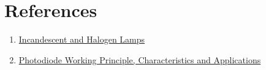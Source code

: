 \section*{References}

\begin{enumerate}

\item \href{https://www.fh-muenster.de/ciw/downloads/personal/juestel/juestel/4-InkohaerenteLichtquellen-Glueh-_und_Halogenlampen_english_-1.pdf}{Incandescent and Halogen Lamps}

\item \href{https://www.elprocus.com/photodiode-working-principle-applications/}{Photodiode Working Principle, Characteristics and Applications}

\end{enumerate}